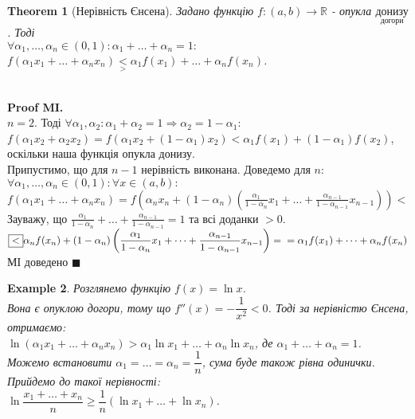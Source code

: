 \documentclass[a4paper, 14pt]{article}
\theoremstyle{theoremdd}
\newtheorem{theorem}{Theorem}[subsection]
\theoremstyle{theoremdd}
\theoremstyle{theoremdd}
\theoremstyle{theoremdd}
\newtheorem{example}[theorem]{Example}
\theoremstyle{theoremdd}
\theoremstyle{theoremdd}
\theoremstyle{theoremdd}
\theoremstyle{theoremdd}
\newenvironment{pfMI}{\vspace*{-3mm} \textbf{\\ Proof MI. \\}}{\hfill $\blacksquare$}
\begin{document}
\begin{theorem}[Нерівність Єнсена]
Задано функцію $f:(a,b) \to \mathbb{R}$ - опукла $\underset{\textrm{догори}}{\textrm{донизу}}$. Тоді\\
$\forall \alpha_1, \dots, \alpha_n \in (0,1): \displaystyle \alpha_1 + \dots + \alpha_n = 1:$\\
$\displaystyle f(\alpha_1 x_1 + \dots + \alpha_n x_n) \underset{>}{<} \alpha_1 f(x_1) + \dots + \alpha_n f(x_n)$.
\end{theorem}

\begin{pfMI}
$n = 2$. Тоді $\forall \alpha_1, \alpha_2: \alpha_1 + \alpha_2 = 1 \Rightarrow \alpha_2 = 1- \alpha_1:$\\
$f(\alpha_1 x_2 + \alpha_2 x_2) = f(\alpha_1 x_2 + (1-\alpha_1)x_2) < \alpha_1 f(x_1) + (1-\alpha_1)f(x_2)$, оскільки наша функція опукла донизу.\\
Припустимо, що для $n-1$ нерівність виконана. Доведемо для $n$:\\
$\forall \alpha_1,\dots,\alpha_n \in (0,1): \forall x \in (a,b):$\\
$f(\alpha_1 x_1 + \dots + \alpha_n x_n) = \displaystyle f\left(\alpha_n x_n + (1-\alpha_n)\left(\frac{\alpha_1}{1-\alpha_n}x_1 + \dots + \frac{\alpha_{n-1}}{1-\alpha_{n-1}}x_{n-1} \right)\right) \boxed{<}$\\
Зауважу, що $\displaystyle \frac{\alpha_1}{1-\alpha_n} + \dots + \frac{\alpha_{n-1}}{1-\alpha_{n-1}} = 1$ та всі доданки $>0$.\\
$\boxed{<} \displaystyle \alpha_n f(x_n) + (1-\alpha_n)\left(\frac{\alpha_1}{1-\alpha_n}x_1 + \dots + \frac{\alpha_{n-1}}{1-\alpha_{n-1}}x_{n-1} \right) = \\ = \alpha_1 f(x_1) + \dots + \alpha_n f(x_n)$\\
МІ доведено
\end{pfMI}

\begin{example}
Розглянемо функцію $f(x) = \ln x$.\\
Вона є опуклою догори, тому що $f''(x) = -\dfrac{1}{x^2} < 0$. Тоді за нерівністю Єнсена, отримаємо:\\
$\ln(\alpha_1 x_1 + \dots + \alpha_n x_n) > \alpha_1 \ln x_1 + \dots + \alpha_n \ln x_n$, де $\alpha_1 + \dots + \alpha_n = 1$.\\
Можемо встановити $\alpha_1 = \dots = \alpha_n = \dfrac{1}{n}$, сума буде також рівна одинички. Прийдемо до такої нерівності:\\
$\ln \dfrac{x_1+\dots+x_n}{n} \geq \dfrac{1}{n} \left( \ln x_1 + \dots + \ln x_n \right)$.
\end{example}
\end{document}
